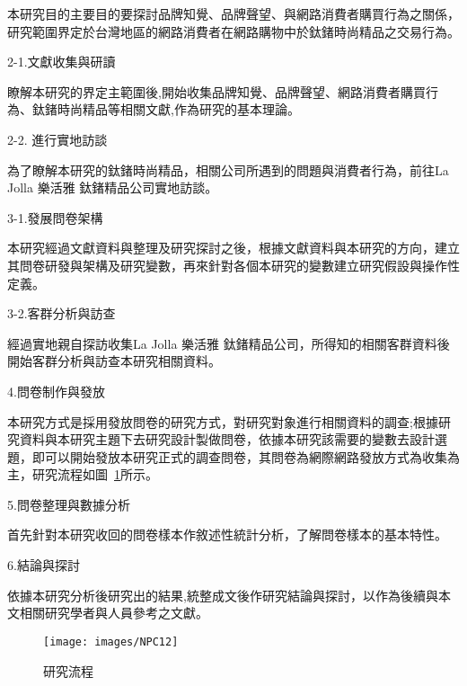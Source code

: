          本研究目的主要目的要探討品牌知覺、品牌聲望、與網路消費者購買行為之關係，研究範圍界定於台灣地區的網路消費者在網路購物中於鈦鍺時尚精品之交易行為。

2-1.文獻收集與研讀

        瞭解本研究的界定主範圍後,開始收集品牌知覺、品牌聲望、網路消費者購買行為、鈦鍺時尚精品等相關文獻,作為研究的基本理論。

2-2. 進行實地訪談

        為了瞭解本研究的鈦鍺時尚精品，相關公司所遇到的問題與消費者行為，前往La Jolla 樂活雅 鈦鍺精品公司實地訪談。

3-1.發展問卷架構

       本研究經過文獻資料與整理及研究探討之後，根據文獻資料與本研究的方向，建立其問卷研發與架構及研究變數，再來針對各個本研究的變數建立研究假設與操作性定義。

3-2.客群分析與訪查

      經過實地親自探訪收集La Jolla 樂活雅 鈦鍺精品公司，所得知的相關客群資料後開始客群分析與訪查本研究相關資料。

4.問卷制作與發放

      本研究方式是採用發放問卷的研究方式，對研究對象進行相關資料的調查;根據研究資料與本研究主題下去研究設計製做問卷，依據本研究該需要的變數去設計選題，即可以開始發放本研究正式的調查問卷，其問卷為網際網路發放方式為收集為主，研究流程如圖~\ref{fig:NPC12}所示。

5.問卷整理與數據分析

      首先針對本研究收回的問卷樣本作敘述性統計分析，了解問卷樣本的基本特性。

6.結論與探討

     依據本研究分析後研究出的結果,統整成文後作研究結論與探討，以作為後續與本文相關研究學者與人員參考之文獻。

\begin{figure}[h]
\centering \texttt{[image: images/NPC12]}
\caption{\label{fig:NPC12}研究流程}
\end{figure}





